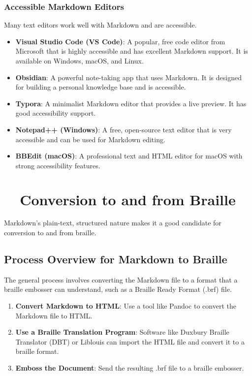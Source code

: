 \subsubsection{Accessible Markdown Editors}
\label{ssubsec:accessible-markdown-editors-details}
Many text editors work well with Markdown and are accessible.
\begin{itemize}
	\item \textbf{Visual Studio Code (VS Code)}: A popular, free code editor from Microsoft that is highly accessible and has excellent Markdown support. It is available on Windows, macOS, and Linux.
	\item \textbf{Obsidian}: A powerful note-taking app that uses Markdown. It is designed for building a personal knowledge base and is accessible.
	\item \textbf{Typora}: A minimalist Markdown editor that provides a live preview. It has good accessibility support.
	\item \textbf{Notepad++ (Windows)}: A free, open-source text editor that is very accessible and can be used for Markdown editing.
	\item \textbf{BBEdit (macOS)}: A professional text and HTML editor for macOS with strong accessibility features.
\end{itemize}

\section{~~Conversion to and from Braille}
\label{sec:markdown-braille-conversion}
Markdown's plain-text, structured nature makes it a good candidate for conversion to and from braille.

\subsection{Process Overview for Markdown to Braille}
\label{subsec:markdown-to-braille}
The general process involves converting the Markdown file to a format that a \gls{braille} embosser can understand, such as a \gls{Braille Ready Format} (.brf) file.
\begin{enumerate}
	\item \textbf{Convert Markdown to HTML}: Use a tool like Pandoc to convert the Markdown file to HTML.
	\item \textbf{Use a Braille Translation Program}: Software like Duxbury Braille Translator (DBT) or Liblouis can import the HTML file and convert it to a braille format.
	\item \textbf{Emboss the Document}: Send the resulting .brf file to a braille embosser.
\end{enumerate}

